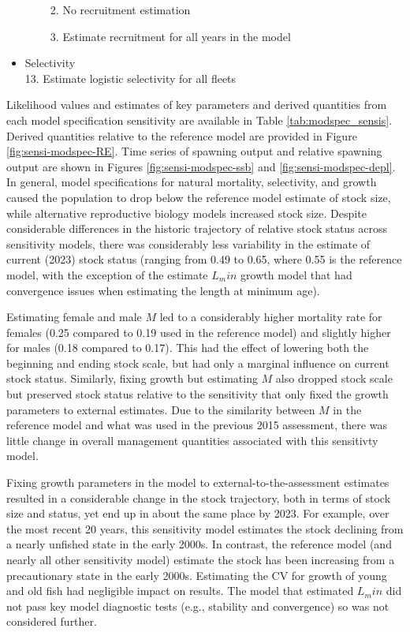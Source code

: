 \documentclass[11pt,
  english,
  letterpaper,
]{article}
\providecommand{\tightlist}{%
  \setlength{\itemsep}{0pt}\setlength{\parskip}{0pt}}
\providecommand{\tightlist}{%
  \setlength{\itemsep}{0pt}\setlength{\parskip}{0pt}}
\begin{document}
\begin{itemize}
\begin{itemize}
    \begin{enumerate}
    \def\labelenumi{\arabic{enumi}.}
    \setcounter{enumi}{10}
    \tightlist
    \item
      No recruitment estimation
    \item
      Estimate recruitment for all years in the model
    \end{enumerate}
  \end{itemize}
\item
  Selectivity\\
  13. Estimate logistic selectivity for all fleets
\end{itemize}

Likelihood values and estimates of key parameters and derived quantities from each model specification sensitivity are available in Table \ref{tab:modspec_sensis}. Derived quantities relative to the reference model are provided in Figure \ref{fig:sensi-modspec-RE}. Time series of spawning output and relative spawning output are shown in Figures \ref{fig:sensi-modspec-ssb} and \ref{fig:sensi-modspec-depl}. In general, model specifications for natural mortality, selectivity, and growth caused the population to drop below the reference model estimate of stock size, while alternative reproductive biology models increased stock size. Despite considerable differences in the historic trajectory of relative stock status across sensitivity models, there was considerably less variability in the estimate of current (2023) stock status (ranging from 0.49 to 0.65, where 0.55 is the reference model, with the exception of the estimate \(L_min\) growth model that had convergence issues when estimating the length at minimum age).

Estimating female and male \(M\) led to a considerably higher mortality rate for females (0.25 compared to 0.19 used in the reference model) and slightly higher for males (0.18 compared to 0.17). This had the effect of lowering both the beginning and ending stock scale, but had only a marginal influence on current stock status. Similarly, fixing growth but estimating \(M\) also dropped stock scale but preserved stock status relative to the sensitivity that only fixed the growth parameters to external estimates. Due to the similarity between \(M\) in the reference model and what was used in the previous 2015 assessment, there was little change in overall management quantities associated with this sensitivty model.

Fixing growth parameters in the model to external-to-the-assessment estimates resulted in a considerable change in the stock trajectory, both in terms of stock size and status, yet end up in about the same place by 2023. For example, over the most recent 20 years, this sensitivity model estimates the stock declining from a nearly unfished state in the early 2000s. In contrast, the reference model (and nearly all other sensitivity model) estimate the stock has been increasing from a precautionary state in the early 2000s. Estimating the CV for growth of young and old fish had negligible impact on results. The model that estimated \(L_min\) did not pass key model diagnostic tests (e.g., stability and convergence) so was not considered further.
\end{document}
